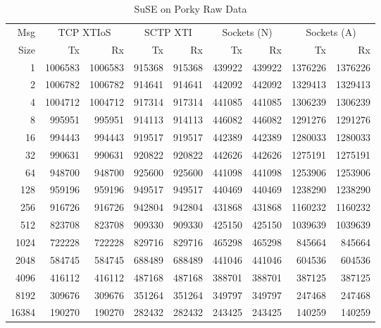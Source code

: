 \documentclass[letterpaper,final,notitlepage,twocolumn,10pt,twoside]{article}
\let\normalsize = \small
\let\small = \footnotesize
\let\footnotesize = \scriptsize
\let\scriptsize = \tiny
\begin{document}
\begin{appendix}
\begin{table}[hbp]
\footnotesize
\begin{center}
\setlength{\tabcolsep}{0.2em}
\setlength{\arraycolsep}{0.2em}
\begin{tabular}{rrrrrrrrr}\\
Msg & \multicolumn{2}{c}{TCP XTIoS} & \multicolumn{2}{c}{SCTP XTI} & \multicolumn{2}{c}{Sockets (N)} & \multicolumn{2}{c}{Sockets (A)}\\
Size & Tx & Rx & Tx & Rx & Tx & Rx & Tx & Rx\\
\hline
\hline
1 & 1006583 & 1006583 & 915368 & 915368 & 439922 & 439922 & 1376226 & 1376226\\
2 & 1006782 & 1006782 & 914641 & 914641 & 442092 & 442092 & 1329413 & 1329413\\
4 & 1004712 & 1004712 & 917314 & 917314 & 441085 & 441085 & 1306239 & 1306239\\
8 & 995951 & 995951 & 914113 & 914113 & 446082 & 446082 & 1291276 & 1291276\\
16 & 994443 & 994443 & 919517 & 919517 & 442389 & 442389 & 1280033 & 1280033\\
32 & 990631 & 990631 & 920822 & 920822 & 442626 & 442626 & 1275191 & 1275191\\
64 & 948700 & 948700 & 925600 & 925600 & 441098 & 441098 & 1253906 & 1253906\\
128 & 959196 & 959196 & 949517 & 949517 & 440469 & 440469 & 1238290 & 1238290\\
256 & 916726 & 916726 & 942804 & 942804 & 431868 & 431868 & 1160232 & 1160232\\
512 & 823708 & 823708 & 909330 & 909330 & 425150 & 425150 & 1039639 & 1039639\\
1024 & 722228 & 722228 & 829716 & 829716 & 465298 & 465298 & 845664 & 845664\\
2048 & 584745 & 584745 & 688489 & 688489 & 441046 & 441046 & 604536 & 604536\\
4096 & 416112 & 416112 & 487168 & 487168 & 388701 & 388701 & 387125 & 387125\\
8192 & 309676 & 309676 & 351264 & 351264 & 349797 & 349797 & 247468 & 247468\\
16384 & 190270 & 190270 & 282432 & 282432 & 243425 & 243425 & 140259 & 140259\\
\hline
\end{tabular}
\end{center}
\normalsize
\caption[SuSE on Porky Raw Data]{SuSE on Porky Raw Data}
\label{table:susedata}
\end{table}


\end{appendix}
\end{document}
